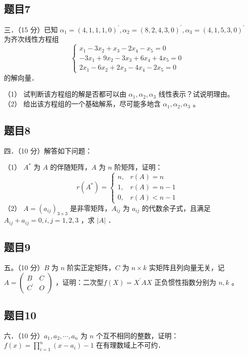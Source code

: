 \documentclass{article}
\begin{document}
\subsection{题目7}
三．（15 分）已知 \(\alpha_{1}=(4,1,1,1,0)^{\prime}, \alpha_{2}=(8,2,4,3,0)^{\prime}, \alpha_{3}=(4,1,5,3,0)^{\prime}\) 为齐次线性方程组
\[
\left\{\begin{array}{l}
x_{1}-3 x_{2}+x_{3}-2 x_{4}-x_{5}=0 \\
-3 x_{1}+9 x_{2}-3 x_{3}+6 x_{4}+4 x_{5}=0 \\
2 x_{1}-6 x_{2}+2 x_{3}-4 x_{4}-2 x_{5}=0
\end{array}\right.
\]
的解向量．

（1） 试判断该方程组的解是否都可以由 \(\alpha_{1}, \alpha_{2}, \alpha_{3}\) 线性表示？试说明理由。
（2） 给出该方程组的一个基础解系，尽可能多地含 \(\alpha_{1}, \alpha_{2}, \alpha_{3}\) 。

\subsection{题目8}
四．（10 分）解答如下问题：

（1） \(A^{*}\) 为 \(A\) 的伴随矩阵，\(A\) 为 \(n\) 阶矩阵，证明：
\[
r\left(A^{*}\right)= \begin{cases}n, & r(A)=n \\ 1, & r(A)=n-1 \\ 0, & r(A)<n-1\end{cases}
\]
（2） \(A=\left(a_{i j}\right)_{3 \times 3}\) 是非零矩阵，\(A_{i j}\) 为 \(a_{i j}\) 的代数余子式，且满足 \(A_{i j}+a_{i j}=0, i, j=1,2,3\) ，求 \(|A|\) ．

\subsection{题目9}
五。（10 分）\(B\) 为 \(n\) 阶实正定矩阵，\(C\) 为 \(n \times k\) 实矩阵且列向量无关，记 \(A=\left(\begin{array}{cc}B & C \\ C^{\prime} & O\end{array}\right)\) ，证明：二次型\(f(X)=X^{\prime} A X\) 正负惯性指数分别为 \(n, k\) 。

\subsection{题目10}
六．（10 分）\(a_{1}, a_{2}, \cdots, a_{n}\) 为 \(n\) 个互不相同的整数，证明：\(f(x)=\prod_{i=1}^{n}\left(x-a_{i}\right)-1\) 在有理数域上不可约．
\end{document}
